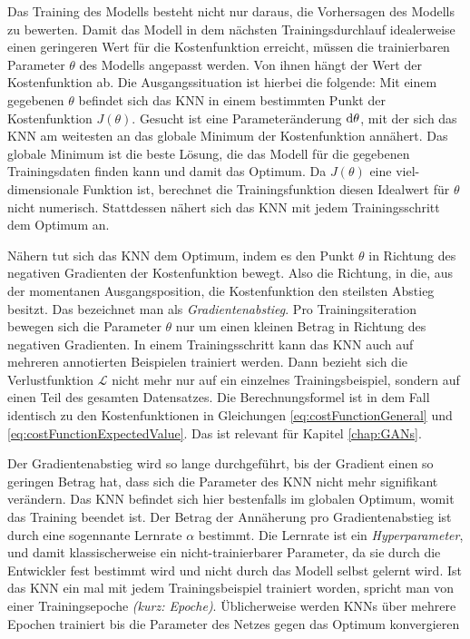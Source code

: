 Das Training des Modells besteht nicht nur daraus, die Vorhersagen des Modells zu bewerten. Damit das Modell in dem nächsten Trainingsdurchlauf idealerweise einen geringeren Wert für die Kostenfunktion erreicht, müssen die trainierbaren Parameter $\theta$ des Modells angepasst werden. Von ihnen hängt der Wert der Kostenfunktion ab. Die Ausgangssituation ist hierbei die folgende: Mit einem gegebenen $\theta$ befindet sich das \ac{KNN} in einem bestimmten Punkt der Kostenfunktion $J(\theta)$. Gesucht ist eine Parameteränderung $\mathop{}\!\mathrm{d}\theta$, mit der sich das \ac{KNN} am weitesten an das globale Minimum der Kostenfunktion annähert. Das globale Minimum ist die beste Lösung, die das Modell für die gegebenen Trainingsdaten finden kann und damit das Optimum. Da $J(\theta)$ eine viel-dimensionale Funktion ist, berechnet die Trainingsfunktion diesen Idealwert für $\theta$ nicht numerisch. Stattdessen nähert sich das \ac{KNN} mit jedem Trainingsschritt dem Optimum an. \cite{knnsKompakt}

Nähern tut sich das \ac{KNN} dem Optimum, indem es den Punkt $\theta$ in Richtung des negativen Gradienten der Kostenfunktion bewegt. Also die Richtung, in die, aus der momentanen Ausgangsposition, die Kostenfunktion den steilsten Abstieg besitzt. Das bezeichnet man als \emph{Gradientenabstieg}. Pro Trainingsiteration bewegen sich die Parameter $\theta$ nur um einen kleinen Betrag in Richtung des negativen Gradienten. In einem Trainingsschritt kann das \ac{KNN} auch auf mehreren annotierten Beispielen trainiert werden. Dann bezieht sich die Verlustfunktion $\mathcal{L}$ nicht mehr nur auf ein einzelnes Trainingsbeispiel, sondern auf einen Teil des gesamten Datensatzes. Die Berechnungsformel ist in dem Fall identisch zu den Kostenfunktionen in Gleichungen \ref{eq:costFunctionGeneral} und \ref{eq:costFunctionExpectedValue}. Das ist relevant für Kapitel \ref{chap:GANs}. \cite{knnsKompakt}

Der Gradientenabstieg wird so lange durchgeführt, bis der Gradient einen so geringen Betrag hat, dass sich die Parameter des \ac{KNN} nicht mehr signifikant verändern. Das \ac{KNN} befindet sich hier bestenfalls im globalen Optimum, womit das Training beendet ist. Der Betrag der Annäherung pro Gradientenabstieg ist durch eine sogennante Lernrate $\alpha$ bestimmt. Die Lernrate ist ein \emph{Hyperparameter}, und damit klassischerweise ein nicht-trainierbarer Parameter, da sie durch die Entwickler fest bestimmt wird und nicht durch das Modell selbst gelernt wird. Ist das \ac{KNN} ein mal mit jedem Trainingsbeispiel trainiert worden, spricht man von einer Trainingsepoche \emph{(kurz: Epoche)}. Üblicherweise werden \acp{KNN} über mehrere Epochen trainiert bis die Parameter des Netzes gegen das Optimum konvergieren \cite{knnsKompakt}

